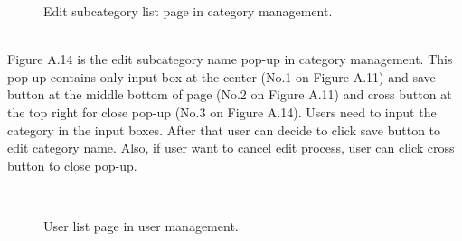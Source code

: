 \documentclass[12pt,oneside,openright,a4paper]{cpe-english-project}
\begin{document}
\begin{figure}[!h]\centering
{}
\caption{Edit subcategory list page in category management.
}\label{fig:Edit subcategory list page in category management.
}
\end{figure} \\

Figure A.14 is the edit subcategory name pop-up in category management. This pop-up contains only input box at the center (No.1 on Figure A.11) and save button at the middle 
bottom of page (No.2 on Figure A.11) and cross button at the top right for close pop-up (No.3 
on Figure A.14).
Users need to input the category in the input boxes. After that user can decide to 
click save button to edit category name. Also, if user want to cancel edit process, user can 
click cross button to close pop-up.


  \\
\begin{figure}[!h]\centering
{}
\caption{User list page in user management.
}\label{fig:User list page in user management.
}
\end{figure} \\
\end{document}
